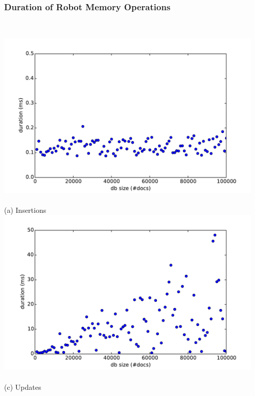 \begin{frame}
  \frametitle{Duration of Robot Memory Operations}
  \centering
  \begin{columns}
    \begin{column}{0.55\textwidth}
  \centering
    \small
    \\\vspace{-0.15cm}
    \includegraphics[width=\textwidth]{../thesis/plots/insert-durations}\\
    \\\vspace{-0.05cm}
    (a) Insertions
    \\\vspace{-0.1cm}
    \includegraphics[width=\textwidth]{../thesis/plots/update-durations}\\
    \\\vspace{-0.05cm}
    (c) Updates
    \end{column}
    \begin{column}{0.55\textwidth}

\end{column}
\end{columns}
\end{frame}

